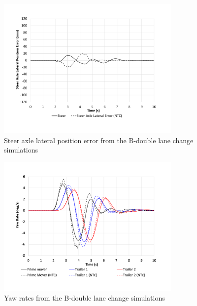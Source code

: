     \begin{figure}[H]
        \centering
        \includegraphics[width=0.8\textwidth]{fig/ntc-b-double_lcb}
        \caption{Steer axle lateral position error from the B-double lane change simulations}
        \label{figure:ntc-b-double_lcb}
    \end{figure}

    \begin{figure}[H]
        \centering
        \includegraphics[width=0.8\textwidth]{fig/ntc-b-double_lcc}
        \caption{Yaw rates from the B-double lane change simulations}
        \label{figure:ntc-b-double_lcc}
    \end{figure}

